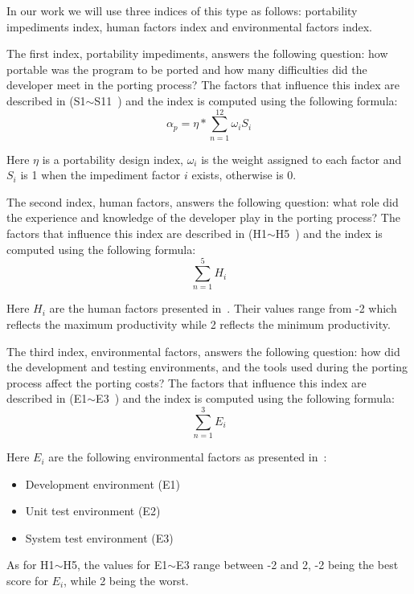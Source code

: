 In our work we will use three indices of this type as follows: portability
impediments index, human factors index and environmental factors index.

The first index, portability impediments, answers the following question: how
portable was the program to be ported and how many difficulties did the
developer meet in the porting process? The factors that influence this index are
described in (S1$\sim$S11~\cite{b2}) and the index is computed using the
following formula: \[ \alpha_p = \eta * \sum_{n=1}^{12} \omega_i S_i \]

Here $\eta$ is a portability design index, $\omega_i$ is the weight assigned to
each factor and $S_i$ is 1 when the impediment factor $i$ exists, otherwise is
0.

The second index, human factors, answers the following question: what role did
the experience and knowledge of the developer play in the porting process? The
factors that influence this index are described in (H1$\sim$H5~\cite{b2}) and
the index is computed using the following formula: \[ \sum_{n=1}^{5} H_i \]

Here $H_i$ are the human factors presented in~\cite{b2}. Their values range
from -2 which reflects the maximum productivity while 2 reflects the minimum
productivity.

The third index, environmental factors, answers the following question: how did
the development and testing environments, and the tools used during the porting
process affect the porting costs? The factors that influence this index are
described in (E1$\sim$E3~\cite{b2}) and the index is computed using the
following formula: \[ \sum_{n=1}^{3} E_i \]

Here $E_i$ are the following environmental factors as presented in~\cite{b2}:
\begin{itemize}
    \item Development environment (E1)
    \item Unit test environment (E2)
    \item System test environment (E3)
\end{itemize}

As for H1$\sim$H5, the values for E1$\sim$E3 range between -2 and 2, -2 being the best
score for $E_i$, while 2 being the worst.
